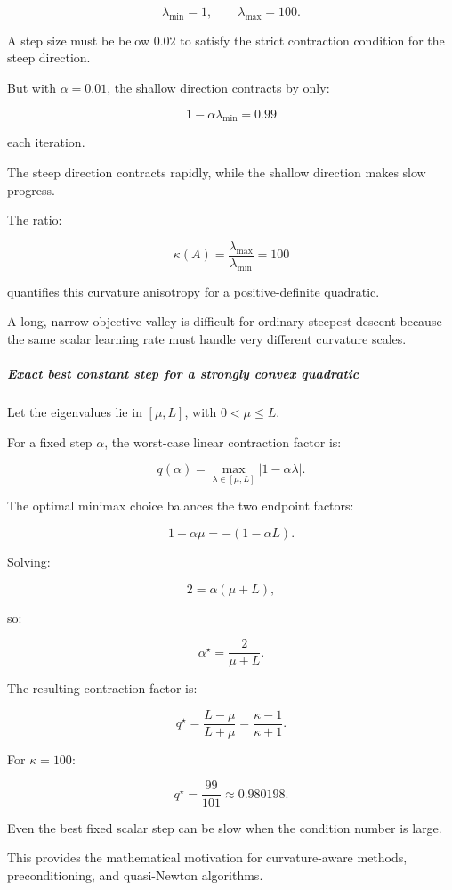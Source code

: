 \[
\lambda_{\min}=1, \qquad \lambda_{\max}=100.
\]

A step size must be below \(0.02\) to satisfy the strict contraction condition for the steep direction.

But with \(\alpha=0.01\), the shallow direction contracts by only:

\[
1-\alpha\lambda_{\min}=0.99
\]

each iteration.

The steep direction contracts rapidly, while the shallow direction makes slow progress.

The ratio:

\[
\boxed{\kappa(A)=\frac{\lambda_{\max}}{\lambda_{\min}}=100}
\]

quantifies this curvature anisotropy for a positive-definite quadratic.

A long, narrow objective valley is difficult for ordinary steepest descent because the same scalar learning rate must handle very different curvature scales.

\subparagraph{Exact best constant step for a strongly convex quadratic}\label{exact-best-constant-step-for-a-strongly-convex-quadratic}

Let the eigenvalues lie in \([\mu,L]\), with \(0<\mu\le L\).

For a fixed step \(\alpha\), the worst-case linear contraction factor is:

\[
q(\alpha)= \max_{\lambda\in[\mu,L]} |1-\alpha\lambda|.
\]

The optimal minimax choice balances the two endpoint factors:

\[
1-\alpha\mu=-(1-\alpha L).
\]

Solving:

\[
2=\alpha(\mu+L),
\]

so:

\[
\boxed{ \alpha^\star=\frac2{\mu+L} }.
\]

The resulting contraction factor is:

\[
\boxed{ q^\star=\frac{L-\mu}{L+\mu} =\frac{\kappa-1}{\kappa+1} }.
\]

For \(\kappa=100\):

\[
q^\star=\frac{99}{101}\approx0.980198.
\]

Even the best fixed scalar step can be slow when the condition number is large.

This provides the mathematical motivation for curvature-aware methods, preconditioning, and quasi-Newton algorithms.

